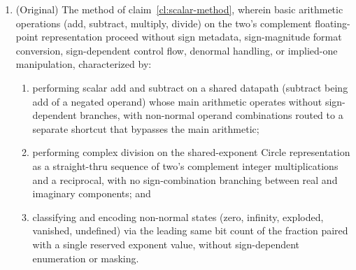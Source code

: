 \documentclass[12pt,letter]{article}
\begin{document}
\begin{enumerate}
    \item (Original) The method of claim~\ref{cl:scalar-method}, wherein basic arithmetic operations (add, subtract, multiply, divide) on the two's complement floating-point representation proceed without sign metadata, sign-magnitude format conversion, sign-dependent control flow, denormal handling, or implied-one manipulation, characterized by:
          \begin{enumerate}
              \item performing scalar add and subtract on a shared datapath (subtract being add of a negated operand) whose main arithmetic operates without sign-dependent branches, with non-normal operand combinations routed to a separate shortcut that bypasses the main arithmetic;
              \item performing complex division on the shared-exponent Circle representation as a straight-thru sequence of two's complement integer multiplications and a reciprocal, with no sign-combination branching between real and imaginary components; and
              \item classifying and encoding non-normal states (zero, infinity, exploded, vanished, undefined) via the leading same bit count of the fraction paired with a single reserved exponent value, without sign-dependent enumeration or masking.
          \end{enumerate}


\end{enumerate}
\end{document}
